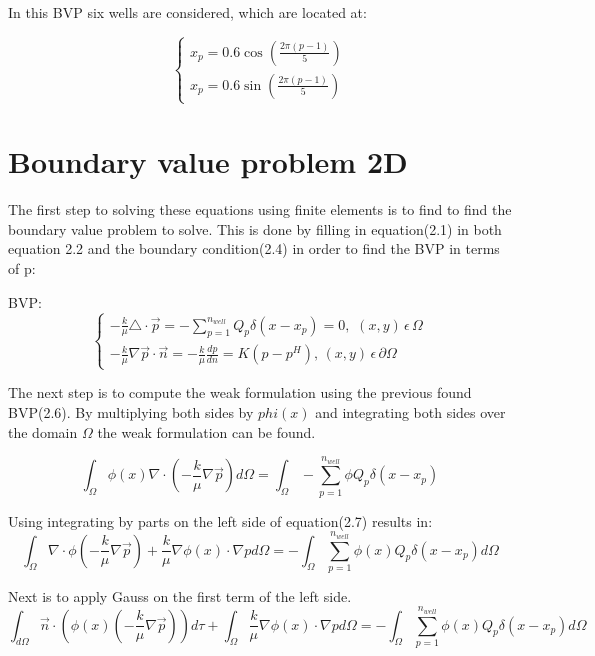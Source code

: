 \documentclass[a4paper]{report}
\begin{document}
In this BVP six wells are considered, which are located at:


\begin{equation}
	\begin{cases} 
		x_p=0.6\cos(\frac{2\pi (p-1)}{5}) \\ x_p=0.6\sin(\frac{2\pi (p-1)}{5})
	\end{cases} 
\end{equation}


\section{Boundary value problem 2D}
The first step to solving these equations using finite elements is to find to find the boundary value problem to solve. This is done by filling in equation(2.1) in both equation 2.2 and the boundary condition(2.4) in order to find the BVP in terms of p:
\vspace{5mm}

BVP:
\begin{equation}
	\begin{cases}
		-\frac{k}{\mu}\triangle\cdot\vec{p}=-\sum_{p=1}^{n_{well}}Q_p\delta(x-x_p)=0,\, \, (x,y) \, \epsilon \, \Omega\\
		-\frac{k}{\mu}\nabla\vec{p}\cdot\vec{n}=-\frac{k}{\mu}\frac{dp}{dn} =K(p-p^H), \, (x,y)\,  \epsilon  \, \partial\Omega
	\end{cases}
\end{equation}

\bigskip

The next step is to compute the weak formulation using the previous found BVP(2.6). By multiplying both sides by $phi(x)$ and integrating both sides over the domain $\Omega$ the weak formulation can be found.

\begin{equation}
	\int_{\Omega}\phi(x)\nabla\cdot( -\frac{k}{\mu}\nabla\vec{p}) d\Omega =\int_{\Omega}-\sum_{p=1}^{n_{well}}\phi  Q_p\delta(x-x_p)
\end{equation}

Using integrating by parts on the left side of equation(2.7) results in:
\begin{equation}
	\int_{\Omega}\nabla\cdot\phi(-\frac{k}{\mu}\nabla\vec{p})+\frac{k}{\mu}\nabla\phi(x)\cdot\nabla p d\Omega= -\int_{\Omega}\sum_{p=1}^{n_{well}}\phi(x) Q_p\delta(x-x_p)d\Omega
\end{equation}

Next is to apply Gauss on the first term of the left side.
\begin{equation}
	\int_{d\Omega}\vec{n}\cdot(\phi(x)(-\frac{k}{\mu}\nabla\vec{p}))d\tau+\int_{\Omega}\frac{k}{\mu}\nabla\phi(x)\cdot\nabla p d\Omega= -\int_{\Omega}\sum_{p=1}^{n_{well}}\phi(x) Q_p\delta(x-x_p)d\Omega
\end{equation}
\end{document}
